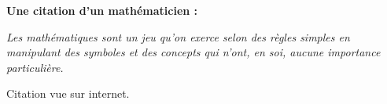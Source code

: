 \documentclass[12pt,french]{article}
\begin{document}
    \begin{center}
        \color{blue}\bfseries Une citation d'un mathématicien : 
    \end{center}\medskip

    {\itshape Les mathématiques sont un jeu qu'on exerce selon des règles simples en manipulant des symboles et des concepts qui n'ont, en soi, aucune importance particulière.}\bigskip

    \begin{flushright}
        Citation vue sur internet.
    \end{flushright}
\end{document}
